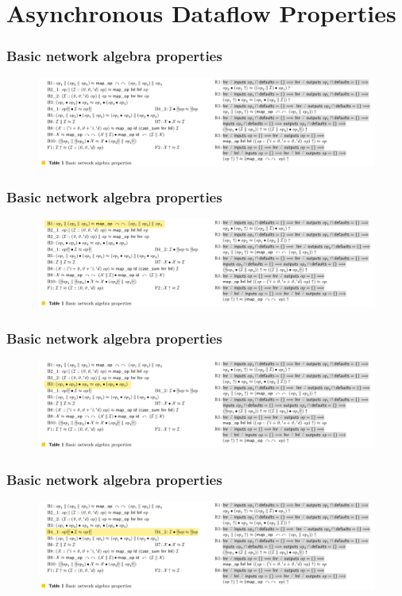 \documentclass[fleqn,aspectratio=169,10pt]{beamer}
\begin{document}
\section{Asynchronous Dataflow Properties}
\begin{frame}[fragile]
  \frametitle{Basic network algebra properties}
  \begin{figure}
    \centering
    \includegraphics[width=1\textwidth]{table_1.png}
  \end{figure}
\end{frame}

\begin{frame}
  \frametitle{Basic network algebra properties}
  \begin{figure}
    \centering
    \includegraphics[width=1\textwidth]{table_1_1.png}
  \end{figure}
\end{frame}

\begin{frame}
  \frametitle{Basic network algebra properties}
  \begin{figure}
    \centering
    \includegraphics[width=1\textwidth]{table_1_2.png}
  \end{figure}
\end{frame}

\begin{frame}
  \frametitle{Basic network algebra properties}
  \begin{figure}
    \centering
    \includegraphics[width=1\textwidth]{table_1_3.png}
  \end{figure}
\end{frame}
\end{document}
